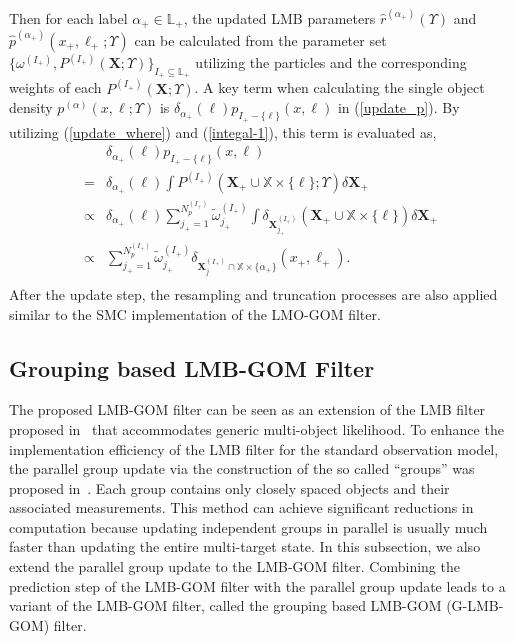 \documentclass[journal]{IEEEtran}
\newcommand{\bX}{{\mathbf X}}
\begin{document}
{Then for each label $\alpha_{+}\in\mathbb{L}_{+}$, the updated LMB parameters $\hat r^{(\alpha_+)}(\Upsilon)$ and $\hat p^{(\alpha_+)}(x_+,\ell_+;\Upsilon)$ can be calculated from the parameter set $\{\omega^{(I_{+})}, P^{(I_{+})}(\bX;\Upsilon) \}_{I_{+}\subseteq \mathbb{L}_{+}}$  utilizing the particles and the corresponding weights of  each  $P^{(I_{+})}(\bX;\Upsilon)$. A key term when calculating the single object density $p^{(\alpha)}(x,\ell;\Upsilon)$ is   $\delta_{\alpha_{+}}(\ell)p_{I_+-\{\ell\}}(x,\!\ell)$ in (\ref{update_p}).  By utilizing (\ref{update_where}) and (\ref{integal-1}), this term  is evaluated  as,
\begin{equation}\label{key-term}
\begin{split}
&\delta_{\alpha_{+}}(\ell)p_{I_+\!-\{\ell\}}(x,\ell)\!\\
= &\delta_{\alpha_{+}}(\ell)\!\int\!\! P^{(I_+)}(\bX_{+}\cup\mathbb{X}\!\times\!\{\ell\};\Upsilon)\delta\bX_+\\
 \propto&\delta_{\alpha_{+}}(\ell){\sum}_{j_{+}=1}^{N_{p}^{(I_+)}}\widetilde\omega^{(I_{+})}_{j_{+}} \int \delta_{\bX^{(I_{+})}_{j_+}}(\bX_{+}\cup\mathbb{X}\times\{\ell\})\delta\bX_+\\
 \propto&{\sum}_{j_{+}=1}^{N_{p}^{(I_+)}}\widetilde\omega^{(I_{+})}_{j_{+}} \delta_{\bX^{(I_+)}_j\cap\mathbb{X}\times \{\alpha_+\}}(x_+,\ell_+).\\
 \end{split}
\end{equation}
After the update step, the resampling and truncation processes are also applied similar to the SMC implementation of the LMO-GOM filter.


\subsection{Grouping based LMB-GOM Filter}
The proposed LMB-GOM filter can be seen as  an extension of the LMB filter proposed in~\cite{refr:label_5} that accommodates generic multi-object likelihood. To enhance the implementation efficiency of the LMB filter for the  standard observation model, the parallel group update via the construction of the so called ``groups'' was proposed in~\cite{refr:label_5}. Each group contains only closely spaced objects and their associated measurements. This method can achieve significant reductions in computation because updating independent groups in parallel is usually much faster than updating the entire multi-target state. In this subsection, we also extend the parallel group update to the LMB-GOM filter.
Combining the prediction step of the LMB-GOM filter with the parallel group update leads to a variant of the LMB-GOM filter,  called the grouping based LMB-GOM (G-LMB-GOM) filter.


}
\end{document}
